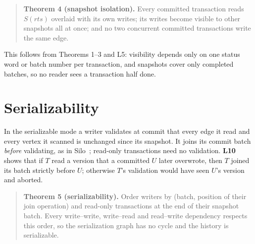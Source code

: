\documentclass[11pt,a4paper,oneside]{report}
\begin{document}
\begin{quote}
\textbf{Theorem 4 (snapshot isolation).} Every committed transaction reads $S(rts)$ overlaid with its own writes; its
writes become visible to other snapshots all at once; and no two concurrent committed transactions write the same
edge.
\end{quote}
This follows from Theorems 1--3 and L5: visibility depends only on one status word or batch number per transaction,
and snapshots cover only completed batches, so no reader sees a transaction half done.

\section{Serializability}
\label{sec:ser-proof}
In the serializable mode a writer validates at commit that every edge it read and every vertex it scanned is unchanged
since its snapshot. It joins its commit batch \emph{before} validating, as in Silo~\cite{silo}; read-only transactions
need no validation.
\textbf{L10} shows that if $T$ read a version that a committed $U$ later overwrote, then $T$ joined its batch strictly
before $U$; otherwise $T$'s validation would have seen $U$'s version and aborted.
\begin{quote}
\textbf{Theorem 5 (serializability).} Order writers by (batch, position of their join operation) and
read-only transactions at the end of their snapshot batch. Every write--write, write--read and read--write dependency
respects this order, so the serialization graph has no cycle and the history is serializable.
\end{quote}
\end{document}
